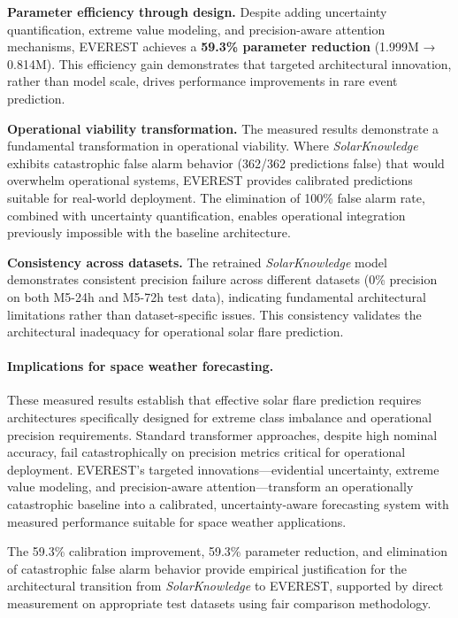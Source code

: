 \textbf{Parameter efficiency through design.}
Despite adding uncertainty quantification, extreme value modeling, and precision-aware attention mechanisms, \textsc{EVEREST} achieves a \textbf{59.3\% parameter reduction} (1.999M → 0.814M). This efficiency gain demonstrates that targeted architectural innovation, rather than model scale, drives performance improvements in rare event prediction.

\textbf{Operational viability transformation.}
The measured results demonstrate a fundamental transformation in operational viability. Where \textit{SolarKnowledge} exhibits catastrophic false alarm behavior (362/362 predictions false) that would overwhelm operational systems, \textsc{EVEREST} provides calibrated predictions suitable for real-world deployment. The elimination of 100\% false alarm rate, combined with uncertainty quantification, enables operational integration previously impossible with the baseline architecture.

\textbf{Consistency across datasets.}
The retrained \textit{SolarKnowledge} model demonstrates consistent precision failure across different datasets (0\% precision on both M5-24h and M5-72h test data), indicating fundamental architectural limitations rather than dataset-specific issues. This consistency validates the architectural inadequacy for operational solar flare prediction.

\paragraph{Implications for space weather forecasting.}
These measured results establish that effective solar flare prediction requires architectures specifically designed for extreme class imbalance and operational precision requirements. Standard transformer approaches, despite high nominal accuracy, fail catastrophically on precision metrics critical for operational deployment. \textsc{EVEREST}'s targeted innovations---evidential uncertainty, extreme value modeling, and precision-aware attention---transform an operationally catastrophic baseline into a calibrated, uncertainty-aware forecasting system with measured performance suitable for space weather applications.

The 59.3\% calibration improvement, 59.3\% parameter reduction, and elimination of catastrophic false alarm behavior provide empirical justification for the architectural transition from \textit{SolarKnowledge} to \textsc{EVEREST}, supported by direct measurement on appropriate test datasets using fair comparison methodology. 